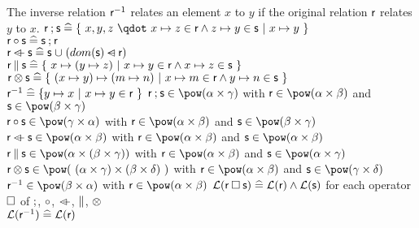 \begin{samepage}
\begin{rodinrefentry}
    The inverse relation $\textsf{r}^{-1}$ relates an element $x$ to $y$ if the original relation $\textsf{r}$
    relates $y$ to $x$.
  \rrdef
    $\exprlr\fcomp\exprls \defi \{~x,y,z~\qdot~x \mapsto z \in\exprlr \land z \mapsto y \in\exprls ~|~ x \mapsto y~\}$\\
    $\textsf{r}\circ\textsf{s} \mathrel{\widehat=} \textsf{s}\mathbin;\textsf{r}$\\
    $\textsf{r}\mathbin{\lhd\mkern-9mu-}\textsf{s} \mathrel{\widehat=} \textsf{s}\mathbin{\mkern1mu\cup\mkern1mu} (dom(\textsf{s})\mathbin{\lhd\mkern-14mu-}\textsf{r})$\\
    $\textsf{r}\mathbin\|\textsf{s} \mathrel{\widehat=} \{~x\mapsto(y\mapsto z)~|~x\mapsto y\in\textsf{r} \land x\mapsto z\in\textsf{s} ~\}$\\
    $\textsf{r}\mathbin\otimes\textsf{s} \mathrel{\widehat=} \{~(x\mapsto y)\mapsto(m\mapsto n)~|~x\mapsto m\in\textsf{r}\land y\mapsto n\in\textsf{s} ~\}$\\
    $\textsf{r}^{-1} \mathrel{\widehat=} \{y\mapsto x~|~x\mapsto y\in\textsf{r}~\}$
  \rrtypes
    $\exprlr\fcomp\exprls\in\pow(\alpha\cprod\gamma)$ with $\exprlr\in\pow(\alpha\cprod\beta)$ and
      $\exprls\in\pow(\beta\cprod\gamma)$\\
    $\exprlr\bcomp\exprls\in\pow(\gamma\cprod\alpha)$ with $\exprlr\in\pow(\alpha\cprod\beta)$ and
      $\exprls\in\pow(\beta\cprod\gamma)$\\
    $\exprlr\ovl\exprls\in\pow(\alpha\cprod\beta)$ with $\exprlr\in\pow(\alpha\cprod\beta)$ and
      $\exprls\in\pow(\alpha\cprod\beta)$\\
    $\exprlr\pprod\exprls\in\pow(\alpha\cprod(\beta\cprod\gamma))$ with $\exprlr\in\pow(\alpha\cprod\beta)$ and
      $\exprls\in\pow(\alpha\cprod\gamma)$\\
    $\exprlr\dprod\exprls\in\pow(~(\alpha\cprod\gamma)\cprod(\beta\cprod\delta)~)$ with
      $\exprlr\in\pow(\alpha\cprod\beta)$ and
      $\exprls\in\pow(\gamma\cprod\delta)$\\
    $\exprlr^{-1}\in\pow(\beta\cprod\alpha)$ with $\exprlr\in\pow(\alpha\cprod\beta)$
  \rrwd
    $\mathcal{L}(\textsf{r}\mathbin{\Box}\textsf{s})\mathrel{\widehat=}\mathcal{L}(\textsf{r})\land\mathcal{L}(\textsf{s})$ for each operator $\mathbin{\Box}$ of
    $\mathbin;$, $\circ$, $\mathbin{\lhd\mkern-9mu-}$, $\mathbin\|$, $\mathbin\otimes$\\
    $\mathcal{L}(\textsf{r}^{-1})\mathrel{\widehat=}\mathcal{L}(\textsf{r})$
\end{rodinrefentry}
\end{samepage}

